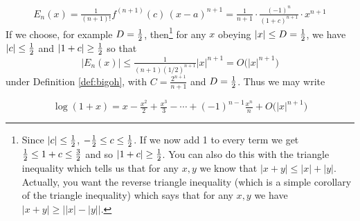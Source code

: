 \begin{eg}
\begin{equation*}
E_n(x)=\tfrac{1}{(n+1)!}f^{(n+1)}(c)\, (x-a)^{n+1}
             = \tfrac{1}{n+1} \cdot \tfrac{(-1)^n}{(1+c)^{n+1}} \cdot x^{n+1}
\end{equation*}
If we choose, for example $D=\tfrac{1}{2}$, then\footnote{Since $|c|\leq \tfrac{1}{2}$,
$-\tfrac{1}{2} \leq c \leq \tfrac{1}{2}$. If we now add 1 to every term we get $\tfrac{1}{2} \leq 1+c \leq \frac{3}{2}$ and so $|1+c| \geq
\tfrac{1}{2}$. You can also do this with the triangle inequality which tells us that for any $x,y$ we know that $|x+y| \leq
|x|+|y|$. Actually, you want the reverse triangle inequality (which is a simple corollary of the triangle inequality)
which says that for any $x,y$ we have $|x+y| \geq \big||x|-|y| \big|$.} for any $x$ obeying $|x|\le D=\tfrac{1}{2}$, we have
$|c|\le\tfrac{1}{2} $ and $|1+c|\ge\tfrac{1}{2}$ so that
\begin{equation*}
|E_n(x)|\le \tfrac{1}{(n+1)(1/2)^{n+1}}|x|^{n+1}
          = O\big(|x|^{n+1}\big)
\end{equation*}
under Definition \ref{def:bigoh}, with $C=\tfrac{2^{n+1}}{n+1}$
and $D=\tfrac{1}{2}$. Thus we may write
\begin{impeqn}\label{eq:bigohlog}
\begin{equation*}
\log(1+x) = x-\tfrac{x^2}{2}+\tfrac{x^3}{3}-\cdots +(-1)^{n-1}\tfrac{x^n}{n}
+O\big(|x|^{n+1}\big)
\end{equation*}
\end{impeqn}
\end{eg}
\goodbreak

